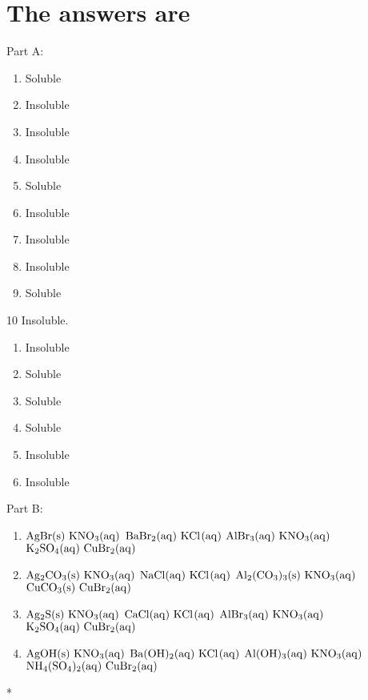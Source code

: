 \documentclass{scrartcl}
\begin{document}
\section{The answers are}
\label{sec:orgd034fa3}
Part A:
\begin{enumerate}
\item Soluble
\item Insoluble
\item Insoluble
\item Insoluble
\item Soluble
\item Insoluble
\item Insoluble
\item Insoluble
\item Soluble
\end{enumerate}
10 Insoluble.
\begin{enumerate}
\item Insoluble
\item Soluble
\item Soluble
\item Soluble
\item Insoluble
\item Insoluble
\end{enumerate}

Part B:
\begin{enumerate}
\item \(\ce{AgBr(s)\ KNO3(aq)}\)
\(\ce{BaBr2(aq)\ KCl(aq)}\)
\(\ce{AlBr3(aq)\ KNO3(aq)}\)
\(\ce{K2SO4(aq)\ CuBr2(aq)}\)

\item \(\ce{Ag2CO3(s)\ KNO3(aq)}\)
\(\ce{NaCl(aq)\ KCl(aq)}\)
\(\ce{Al2(CO3)3(s)\ KNO3(aq)}\)
\(\ce{CuCO3(s)\ CuBr2(aq)}\)

\item \(\ce{Ag2S(s)\ KNO3(aq)}\)
\(\ce{CaCl(aq)\ KCl(aq)}\)
\(\ce{AlBr3(aq)\ KNO3(aq)}\)
\(\ce{K2SO4(aq)\ CuBr2(aq)}\)

\item \(\ce{AgOH(s)\ KNO3(aq)}\)
\(\ce{Ba(OH)2(aq)\ KCl(aq)}\)
\(\ce{Al(OH)3(aq)\ KNO3(aq)}\)
\(\ce{NH4(SO4)2(aq)\ CuBr2(aq)}\)
\end{enumerate}

*
\end{document}

